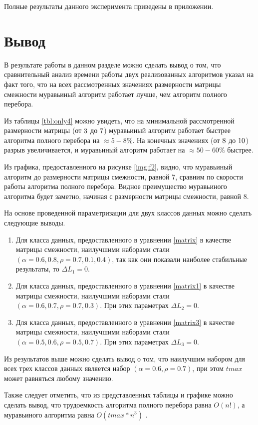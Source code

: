 Полные результаты данного эксперимента приведены в приложении.

\section{Вывод}
В результате работы в данном разделе можно сделать вывод о том, что сравнительный анализ времени работы двух реализованных алгоритмов указал на факт того, что на всех рассмотренных значениях размерности матрицы смежности муравьиный алгоритм работает лучше, чем алгоритм полного перебора. 

Из таблицы \ref{tbl:only4} можно увидеть, что на минимальной рассмотренной размерности матрицы (от $3\time3$ до $7\time7$) муравьиный алгоритм работает быстрее алгоритма полного перебора на $\approx 5 - 8\%$. На конечных значениях (от $8\time38$ до $10\time10$) разрыв увеличивается, и муравьиный алгоритм работает на $\approx 50 - 60\%$ быстрее.

Из графика, предоставленного на рисунке \ref{img:f2}, видно, что муравьиный алгоритм до размерности матрицы смежности, равной 7, сравним по скорости работы алгоритма полного перебора. Видное преимущество муравьиного алгоритма будет заметно, начиная с размерности матрицы смежности, равной 8.

На основе проведенной параметризации для двух классов данных можно сделать следующие выводы.
\begin{enumerate}
	\item Для класса данных, предоставленного в уравнении \ref{matrix} в качестве матрицы смежности, наилучшими наборами стали $(\alpha = 0.6, 0.8, \rho = 0.7, 0.1, 0.4)$, так как они показали наиболее стабильные результаты, то $\Delta L_{1} = 0$.
	\item Для класса данных, предоставленного в уравнении \ref{matrix1} в качестве матрицы смежности, наилучшими наборами стали $(\alpha = 0.6, 0.7, \rho = 0.7, 0.3)$. При этих параметрах $\Delta L_{2} = 0$.
	\item Для класса данных, предоставленного в уравнении \ref{matrix3} в качестве матрицы смежности, наилучшими наборами стали $(\alpha = 0.5, 0.6, \rho = 0.5, 0.7)$. При этих параметрах $\Delta L_{3} = 0$.
\end{enumerate}

Из результатов выше можно сделать вывод о том, что наилучшим набором для всех трех классов данных является набор $(\alpha = 0.6, \rho = 0.7)$, при этом $tmax$ может равняться любому значению. 

Также следует отметить, что из представленных таблицы и графике можно сделать вывод, что трудоемкость алгоритма полного перебора равна $O(n!)$, а муравьиного алгоритма равна $O(tmax * n^3)$ \cite{Ulianov}.